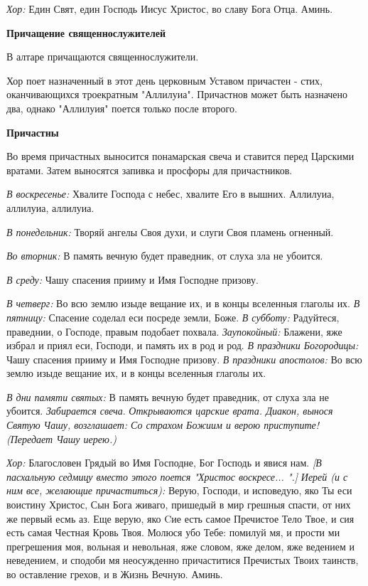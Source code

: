 {\itshape  Хор:} Един Свят, един Господь Иисус Христос, во славу Бога Отца. Аминь. 

{\bfseries  Причащение священнослужителей }

  В алтаре причащаются священнослужители. 

Хор поет назначенный в этот день церковным Уставом причастен - стих, оканчивающихся троекратным "Аллилуиа". Причастнов может быть назначено два, однако "Аллилуия" поется только после второго. 

{\bfseries  Причастны }

      Во время причастных выносится понамарская свеча и ставится перед Царскими вратами. Затем выносятся запивка и просфоры для причастников.

{\itshape  В воскресенье:} Хвалите Господа с небес, хвалите Его в вышних. Аллилуиа, аллилуиа, аллилуиа. 

{\itshape В понедельник:} Творяй ангелы Своя духи, и слуги Своя пламень огненный. 

{\itshape Во вторник:} В память вечную будет праведник, от слуха зла не убоится. 

{\itshape В среду:} Чашу спасения прииму и Имя Господне призову. 

{\itshape В четверг:} Во всю землю изыде вещание их, и в концы вселенныя глаголы их. 
{\itshape 
  В пятницу:} Спасение соделал еси посреде земли, Боже. 
{\itshape 
  В субботу:} Радуйтеся, праведнии, о Господе, правым подобает похвала. 
{\itshape 
  Заупокойный:} Блажени, яже избрал и приял еси, Господи, и память их в род и род. 
{\itshape 
  В праздники Богородицы:} Чашу спасения прииму и Имя Господне призову. 
{\itshape 
  В праздники апостолов:} Во всю землю изыде вещание их, и в концы вселенныя глаголы их. 

{\itshape В дни памяти святых:} В память вечную будет праведник, от слуха зла не убоится. 
{\itshape   Забирается свеча}. 
{\itshape  Открываются царские врата. Диакон, вынося Святую Чашу, возглашает: Со страхом Божиим и верою приступите! 
  (Передает Чашу иерею.) }

{\itshape Хор:} Благословен Грядый во Имя Господне, Бог Господь и явися нам.
{\itshape [В пасхальную седмицу вместо этого поется "Христос воскресе... ".]}
{\itshape  Иерей (и с ним все, желающие причаститься):} Верую, Господи, и исповедую, яко Ты еси воистину Христос, Сын Бога живаго, пришедый в мир грешныя спасти, от них же первый есмь аз. Еще верую, яко Cие есть самое Пречистое Тело Твое, и сия есть самая Честная Кровь Твоя. Молюся убо Тебе: помилуй мя, и прости ми прегрешения моя, вольная и невольная, яже словом, яже делом, яже ведением и неведением, и сподоби мя неосужденно причаститися Пречистых Твоих таинств, во оставление грехов, и в Жизнь Вечную. Аминь.


